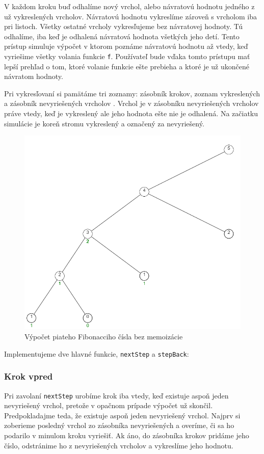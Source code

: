 V každom kroku buď odhalíme nový vrchol, alebo návratovú hodnotu jedného
z už vykreslených vrcholov. Návratovú hodnotu vykreslíme zároveň s vrcholom iba pri listoch.
Všetky ostatné vrcholy vykresľujeme bez návratovej hodnoty. Tú odhalíme, iba keď
je odhalená návratová hodnota všetkých jeho detí. Tento prístup simuluje výpočet v ktorom
poznáme návratovú hodnotu až vtedy, keď vyriešime všetky volania funkcie \lstinline[language=Javascript]{f}.
Používateľ bude vďaka tomto prístupu mať lepší prehľad o tom, ktoré volanie funkcie ešte prebieha
a ktoré je už ukončené návratom hodnoty.

Pri vykresľovaní si pamätáme tri zoznamy: zásobník krokov, zoznam vykreslených a zásobník
nevyriešených vrcholov . Vrchol je v zásobníku nevyriešených vrcholov práve vtedy,
keď je vykreslený ale jeho hodnota ešte nie je odhalená. Na začiatku simulácie je
koreň stromu vykreslený a označený za nevyriešený.

\begin{figure}[h]
\includegraphics[width=\textwidth,height=\textheight,keepaspectratio]{images/bezMemo.png}
\caption{Výpočet piateho Fibonacciho čísla bez memoizácie}
\label{obr:memo}
\end{figure}

Implementujeme dve hlavné funkcie, \lstinline[language=Javascript]{nextStep} a
\lstinline[language=Javascript]{stepBack}:
\subsubsection{Krok vpred}
Pri zavolaní \lstinline[language=Javascript]{nextStep} urobíme krok iba vtedy,
keď existuje aspoň jeden nevyriešený vrchol, pretože v opačnom prípade výpočet už skončil.
Predpokladajme teda, že existuje aspoň jeden nevyriešený vrchol. Najprv si zoberieme
posledný vrchol zo zásobníka nevyriešených a overíme, či sa ho podarilo v minulom kroku vyriešiť.
Ak áno, do zásobníka krokov pridáme jeho číslo, odstránime ho z nevyriešených vrcholov a
vykreslíme jeho hodnotu.

